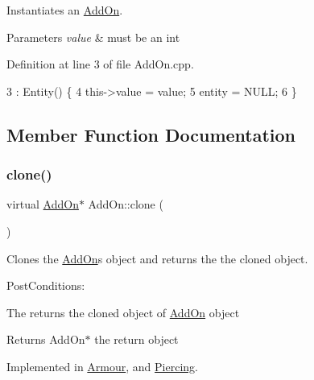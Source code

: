 Instantiates an \hyperlink{classAddOn}{Add\+On}. 


\begin{DoxyParams}{Parameters}
{\em value} & must be an int \\
\hline
\end{DoxyParams}


Definition at line 3 of file Add\+On.\+cpp.


\begin{DoxyCode}
3                      : Entity() \{
4     this->value = value;
5     entity = NULL;
6 \}
\end{DoxyCode}


\subsection{Member Function Documentation}
\mbox{\label{classAddOn_a5a090bf8b4e7260aa35d6f5b9d151955}} 
\subsubsection{\texorpdfstring{clone()}{clone()}}
{\footnotesize\ttfamily virtual \hyperlink{classAddOn}{Add\+On}$\ast$ Add\+On\+::clone (\begin{DoxyParamCaption}{ }\end{DoxyParamCaption})\hspace{0.3cm}{\ttfamily [pure virtual]}}



Clones the \hyperlink{classAddOn}{Add\+On}\textquotesingle{}s object and returns the the cloned object. 

Post\+Conditions\+:
\begin{DoxyItemize}
\item The returns the cloned object of \hyperlink{classAddOn}{Add\+On} object
\end{DoxyItemize}

\begin{DoxyReturn}{Returns}
Add\+On$\ast$ the return object 
\end{DoxyReturn}


Implemented in \hyperlink{classArmour_ab200b02561ecc30c20397913a2bc9511}{Armour}, and \hyperlink{classPiercing_aeb41b04515f5aad4d9f153b0de332849}{Piercing}.

\mbox{\label{classAddOn_aff1f4fa0fb368bbc49838df9c9ddba9c}} 
